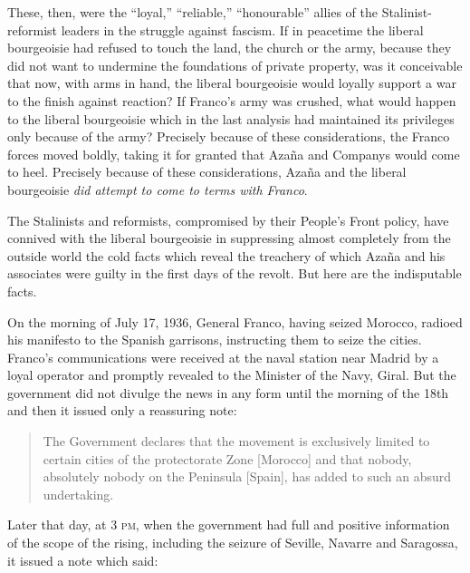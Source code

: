 These, then, were the ``loyal,'' ``reliable,'' ``honourable'' allies of the Stalinist-reformist leaders in the struggle against fascism. If in peacetime the liberal bourgeoisie had refused to touch the land, the church or the army, because they did not want to undermine the foundations of private property, was it conceivable that now, with arms in hand, the liberal bourgeoisie would loyally support a war to the finish against reaction? If Franco’s army was crushed, what would happen to the liberal bourgeoisie which in the last analysis had maintained its privileges only because of the army? Precisely because of these considerations, the Franco forces moved boldly, taking it for granted that Azaña and Companys would come to heel. Precisely because of these considerations, Azaña and the liberal bourgeoisie \emph{did attempt to come to terms with Franco}.

The Stalinists and reformists, compromised by their People’s Front policy, have connived with the liberal bourgeoisie in suppressing almost completely from the outside world the cold facts which reveal the treachery of which Azaña and his associates were guilty in the first days of the revolt. But here are the indisputable facts.

On the morning of July 17, 1936, General Franco, having seized Morocco, radioed his manifesto to the Spanish garrisons, instructing them to seize the cities. Franco’s communications were received at the naval station near Madrid by a loyal operator and promptly revealed to the Minister of the Navy, Giral. But the government did not divulge the news in any form until the morning of the 18th and then it issued only a reassuring note:
\nowidow

\begin{quotation}
  The Government declares that the movement is exclusively limited to certain cities of the protectorate Zone [Morocco] and that nobody, absolutely nobody on the Peninsula [Spain], has added to such an absurd undertaking.
\end{quotation}

Later that day, at 3 \textsc{pm}, when the government had full and positive information of the scope of the rising, including the seizure of Seville, Navarre and Saragossa, it issued a note which said:

